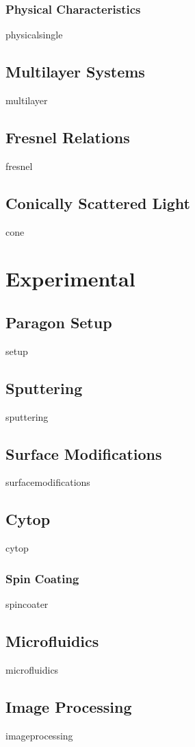 \documentclass[a4paper,titlepage,onecolumn]{report}
\begin{document}
  \subsection{Physical Characteristics}
  {physicalsingle}
 \section{Multilayer Systems}
 {multilayer}
 \section{Fresnel Relations}
 {fresnel}
 \section{Conically Scattered Light}
 {cone}

\chapter{Experimental} \label{ch:experimental}
 \section{Paragon Setup}
 {setup}
 \section{Sputtering}
 {sputtering}
 \section{Surface Modifications}
  {surfacemodifications}
 \section{Cytop}
 {cytop}
  \subsection{Spin Coating}
  {spincoater}
 \section{Microfluidics}
 {microfluidics}
 \section{Image Processing}
 {imageprocessing}
\end{document}
